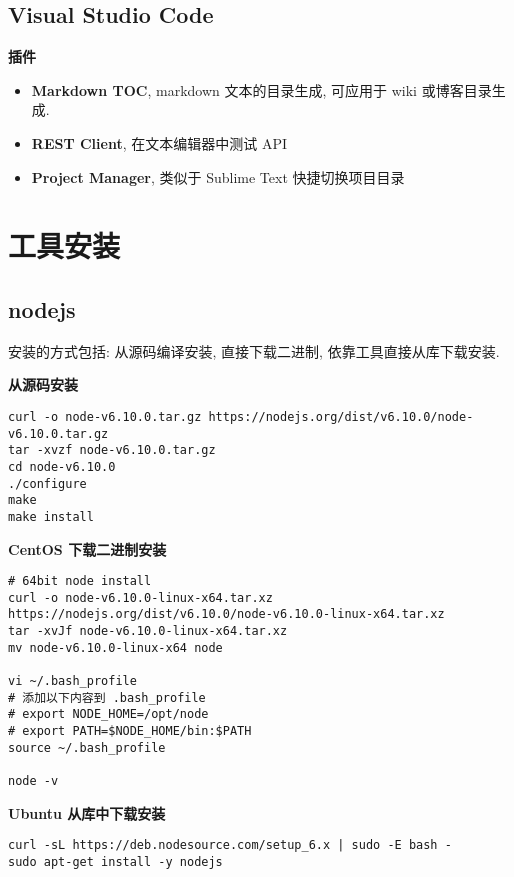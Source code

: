 \subsection{Visual Studio Code}\label{visual-studio-code}

\textbf{插件}

\begin{itemize}
\tightlist
\item
  \textbf{Markdown TOC}, markdown 文本的目录生成, 可应用于 wiki
  或博客目录生成.
\item
  \textbf{REST Client}, 在文本编辑器中测试 API
\item
  \textbf{Project Manager}, 类似于 Sublime Text 快捷切换项目目录
\end{itemize}

\section{工具安装}\label{ux5de5ux5177ux5b89ux88c5}

\subsection{nodejs}\label{nodejs}

安装的方式包括: 从源码编译安装, 直接下载二进制,
依靠工具直接从库下载安装.

\textbf{从源码安装}

\begin{lstlisting}
curl -o node-v6.10.0.tar.gz https://nodejs.org/dist/v6.10.0/node-v6.10.0.tar.gz
tar -xvzf node-v6.10.0.tar.gz
cd node-v6.10.0
./configure
make
make install
\end{lstlisting}

\textbf{CentOS 下载二进制安装}

\begin{lstlisting}
# 64bit node install
curl -o node-v6.10.0-linux-x64.tar.xz https://nodejs.org/dist/v6.10.0/node-v6.10.0-linux-x64.tar.xz
tar -xvJf node-v6.10.0-linux-x64.tar.xz
mv node-v6.10.0-linux-x64 node

vi ~/.bash_profile
# 添加以下内容到 .bash_profile
# export NODE_HOME=/opt/node
# export PATH=$NODE_HOME/bin:$PATH
source ~/.bash_profile

node -v
\end{lstlisting}

\textbf{Ubuntu 从库中下载安装}

\begin{lstlisting}
curl -sL https://deb.nodesource.com/setup_6.x | sudo -E bash -
sudo apt-get install -y nodejs
\end{lstlisting}

